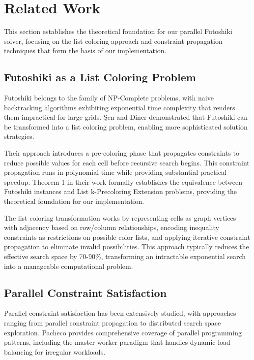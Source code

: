 \section{Related Work}
\label{sec:related_work}
This section establishes the theoretical foundation for our parallel Futoshiki solver, focusing on the list coloring approach and constraint propagation techniques that form the basis of our implementation.

\subsection{Futoshiki as a List Coloring Problem}
\label{subsec:list_coloring_foundation}
Futoshiki belongs to the family of NP-Complete problems, with naive backtracking algorithms exhibiting exponential time complexity that renders them impractical for large grids. Şen and Diner \cite{Sen2024Futoshiki} demonstrated that Futoshiki can be transformed into a list coloring problem, enabling more sophisticated solution strategies.

Their approach introduces a pre-coloring phase that propagates constraints to reduce possible values for each cell before recursive search begins. This constraint propagation runs in polynomial time while providing substantial practical speedup. Theorem 1 in their work formally establishes the equivalence between Futoshiki instances and List k-Precoloring Extension problems, providing the theoretical foundation for our implementation.

The list coloring transformation works by representing cells as graph vertices with adjacency based on row/column relationships, encoding inequality constraints as restrictions on possible color lists, and applying iterative constraint propagation to eliminate invalid possibilities. This approach typically reduces the effective search space by 70-90\%, transforming an intractable exponential search into a manageable computational problem.

\subsection{Parallel Constraint Satisfaction}
\label{subsec:parallel_csp}
Parallel constraint satisfaction has been extensively studied, with approaches ranging from parallel constraint propagation to distributed search space exploration. Pacheco \cite{Pacheco2011} provides comprehensive coverage of parallel programming patterns, including the master-worker paradigm that handles dynamic load balancing for irregular workloads.


